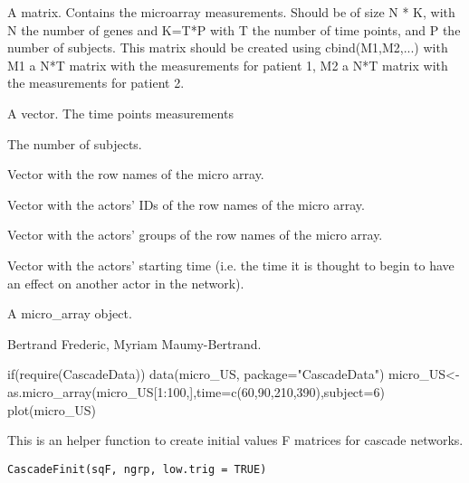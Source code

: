 \documentclass[a4paper]{book}
\begin{document}
%
\begin{Arguments}
\begin{ldescription}
\item[\code{M}] 
A matrix. Contains the microarray measurements. Should be of size N * K, with N the number of genes and K=T*P with T the number of time points, and P the number of subjects. This matrix should be created using cbind(M1,M2,...) with M1 a N*T matrix with the measurements for patient 1, M2 a N*T matrix with the measurements for patient 2.

\item[\code{time}] A vector. The time points measurements
\item[\code{subject}] The number of subjects.
\item[\code{name\_probe}] Vector with the row names of the micro array. 
\item[\code{gene\_ID}] Vector with the actors' IDs of the row names of the micro array.
\item[\code{group}] Vector with the actors' groups of the row names of the micro array.
\item[\code{start\_time}] Vector with the actors' starting time (i.e. the time it is thought to begin to have an effect on another actor in the network).
\end{ldescription}
\end{Arguments}
%
\begin{Value}
A micro\_array object.
\end{Value}
%
\begin{Author}\relax
Bertrand Frederic, Myriam Maumy-Bertrand.
\end{Author}
%
\begin{Examples}
\begin{ExampleCode}
if(require(CascadeData)){
	data(micro_US, package="CascadeData")
	micro_US<-as.micro_array(micro_US[1:100,],time=c(60,90,210,390),subject=6)
	plot(micro_US)
	}
\end{ExampleCode}
\end{Examples}
%
\begin{Description}\relax
This is an helper function to create initial values F matrices for cascade networks.
\end{Description}
%
\begin{Usage}
\begin{verbatim}
CascadeFinit(sqF, ngrp, low.trig = TRUE)
\end{verbatim}
\end{Usage}
\end{document}
